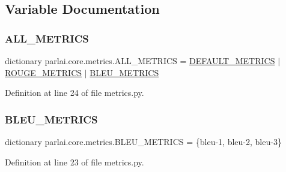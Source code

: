 \subsection{Variable Documentation}
\mbox{\label{namespaceparlai_1_1core_1_1metrics_add79f9806fe8f3343a620c790eb98be7}} 
\subsubsection{\texorpdfstring{A\+L\+L\+\_\+\+M\+E\+T\+R\+I\+CS}{ALL\_METRICS}}
{\footnotesize\ttfamily dictionary parlai.\+core.\+metrics.\+A\+L\+L\+\_\+\+M\+E\+T\+R\+I\+CS = \hyperlink{namespaceparlai_1_1core_1_1metrics_a5cd26a43d8156c993f30c5a707021562}{D\+E\+F\+A\+U\+L\+T\+\_\+\+M\+E\+T\+R\+I\+CS} $\vert$ \hyperlink{namespaceparlai_1_1core_1_1metrics_ac01c4a05e91baee81e771e8f7ae9e7e4}{R\+O\+U\+G\+E\+\_\+\+M\+E\+T\+R\+I\+CS} $\vert$ \hyperlink{namespaceparlai_1_1core_1_1metrics_a5f8ea2258b1137554e4544c463ffc101}{B\+L\+E\+U\+\_\+\+M\+E\+T\+R\+I\+CS}}



Definition at line 24 of file metrics.\+py.

\mbox{\label{namespaceparlai_1_1core_1_1metrics_a5f8ea2258b1137554e4544c463ffc101}} 
\subsubsection{\texorpdfstring{B\+L\+E\+U\+\_\+\+M\+E\+T\+R\+I\+CS}{BLEU\_METRICS}}
{\footnotesize\ttfamily dictionary parlai.\+core.\+metrics.\+B\+L\+E\+U\+\_\+\+M\+E\+T\+R\+I\+CS = \{\textquotesingle{}bleu-\/1\textquotesingle{}, \textquotesingle{}bleu-\/2\textquotesingle{}, \textquotesingle{}bleu-\/3\textquotesingle{}\}}



Definition at line 23 of file metrics.\+py.

